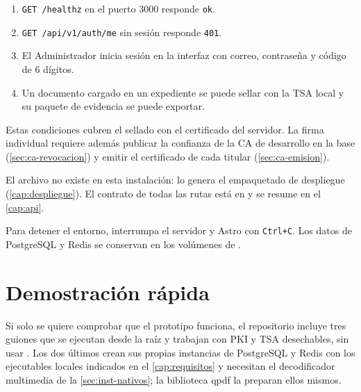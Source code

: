 \begin{enumerate}
  \item \texttt{GET /healthz} en el puerto 3000 responde \texttt{ok}.
  \item \texttt{GET /api/v1/auth/me} sin sesión responde \texttt{401}.
  \item El Administrador inicia sesión en la interfaz con correo,
        contraseña y código de 6 dígitos.
  \item Un documento cargado en un expediente se puede sellar con la TSA
        local y su paquete de evidencia se puede exportar.
\end{enumerate}

Estas condiciones cubren el sellado con el certificado del servidor. La
firma individual requiere además publicar la confianza de la CA de desarrollo en la base (\cref{sec:ca-revocacion}) y
emitir el certificado de cada titular (\cref{sec:ca-emision}).

El archivo  no existe en esta instalación: lo genera
el empaquetado de despliegue (\cref{cap:despliegue}). El contrato de todas
las rutas está en  y se resume en el
\cref{cap:api}.

Para detener el entorno, interrumpa el servidor y Astro con
\texttt{Ctrl+C}. Los datos de PostgreSQL y Redis se conservan en los
volúmenes de .

\section{Demostración rápida}\label{sec:inst-demo}

Si solo se quiere comprobar que el prototipo funciona, el repositorio
incluye tres guiones que se ejecutan desde la raíz y trabajan con PKI y TSA
desechables, sin usar . Los dos últimos crean sus
propias instancias de PostgreSQL y Redis con los ejecutables locales
indicados en el \cref{cap:requisitos} y necesitan el decodificador multimedia de la
\cref{sec:inst-nativos}; la biblioteca qpdf la preparan ellos mismos.

